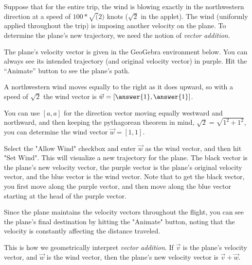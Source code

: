 \documentclass{ximera}
\begin{document}
\begin{example}
  
  Suppose that for the entire trip, the wind is blowing exactly in the northwestern direction at a speed of $100*\sqrt(2)$ knots ($\sqrt{2}$ in the applet). The wind (uniformly applied throughout the trip) is imposing another velocity on the plane. To determine the plane's new trajectory, we need the notion of \textit{vector addition}.

  The plane's velocity vector is given in the GeoGebra environment below. You can always see its intended trajectory (and original velocity vector) in purple. Hit the ``Animate'' button to see the plane's path.

  A northwestern wind moves equally to the right as it does upward, so with a speed of $\sqrt{2}$ the wind vector is $\vec{w}=[\answer{1},\answer{1}]$.

  \begin{solution}

    You can use $[a,a]$ for the direction vector moving equally westward and northward, and then keeping the pythagorean theorem in mind, $\sqrt{2}=\sqrt{1^2+1^2}$, you can determine the wind vector $\vec{w}=[1,1]$.

  \end{solution}

  Select the "Allow Wind" checkbox and enter $\vec{w}$ as the wind vector, and then hit "Set Wind". This will visualize a new trajectory for the plane. The black vector is the plane's new velocity vector, the purple vector is the plane's original velocity vector, and the blue vector is the wind vector. Note that to get the black vector, you first move along the purple vector, and then move along the blue vector starting at the head of the purple vector.

  Since the plane maintains the velocity vectors throughout the flight, you can see the plane's final destination by hitting the "Animate" button, noting that the velocity is constantly affecting the distance traveled.
  \begin{center}
  \end{center}

  \begin{remark}

This is how we geometrically interpret \emph{vector addition}. If $\vec{v}$ is the plane's velocity vector, and $\vec{w}$ is the wind vector, then the plane's new velocity vector is $\vec{v}+\vec{w}$. 


\end{remark}
\end{example}
\end{document}
